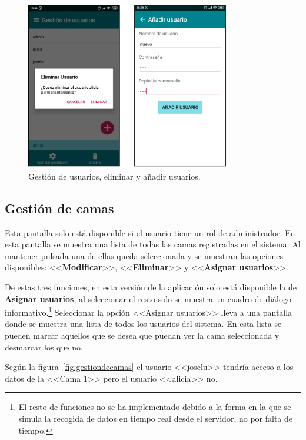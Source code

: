 \begin{figure}[H]
	\centering
	\includegraphics[width=0.8\textwidth]{../img/eliminaranadir.png}
	\caption{Gestión de usuarios, eliminar y añadir usuarios.}
	\label{fig:eliminaranadir}
\end{figure}

\subsection{Gestión de camas}

Esta pantalla solo está disponible si el usuario tiene un rol de administrador. En esta pantalla se muestra una lista de todas las camas registradas en el sistema. Al mantener pulsada una de ellas queda seleccionada y se muestran las opciones disponibles: <<\textbf{Modificar}>>, <<\textbf{Eliminar}>> y <<\textbf{Asignar usuarios}>>.  

De estas tres funciones, en esta versión de la aplicación solo está disponible la de \textbf{Asignar usuarios}, al seleccionar el resto solo se muestra un cuadro de diálogo informativo.\footnote{El resto de funciones no se ha implementado debido a la forma en la que se simula la recogida de datos en tiempo real desde el servidor, no por falta de tiempo.} Seleccionar la opción <<Asignar usuarios>> lleva a una pantalla donde se muestra una lista de todos los usuarios del sistema. En esta lista se pueden marcar aquellos que se desea que puedan ver la cama seleccionada y desmarcar los que no.

Según la figura~\ref{fig:gestiondecamas} el usuario <<joselu>> tendría acceso a los datos de la <<Cama 1>> pero el usuario <<alicia>> no. 

